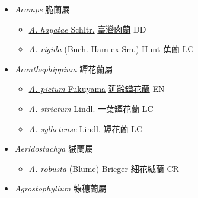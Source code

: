 
  \begin{itemize}
 \item[] \textit{Acampe} 脆蘭屬
                    
  \begin{itemize}
        \item[] \href{http://www.theplantlist.org/tpl1.1/search?q=Acampe+hayatae}{\textit{A. hayatae} Schltr.}   \href{\detokenize{http://taibnet.sinica.edu.tw/chi/taibnet_species_list.php?T2=臺灣肉蘭&T2_new_value=true&fr=y}}{臺灣肉蘭} DD
        \item[] \href{http://www.theplantlist.org/tpl1.1/search?q=Acampe+rigida}{\textit{A. rigida} (Buch.-Ham ex Sm.) Hunt}   \href{\detokenize{http://taibnet.sinica.edu.tw/chi/taibnet_species_list.php?T2=蕉蘭&T2_new_value=true&fr=y}}{蕉蘭} LC
  \end{itemize}
 \item[] \textit{Acanthephippium} 罈花蘭屬
                    
  \begin{itemize}
        \item[] \href{http://www.theplantlist.org/tpl1.1/search?q=Acanthephippium+pictum}{\textit{A. pictum} Fukuyama}   \href{\detokenize{http://taibnet.sinica.edu.tw/chi/taibnet_species_list.php?T2=延齡罈花蘭&T2_new_value=true&fr=y}}{延齡罈花蘭} EN
        \item[] \href{http://www.theplantlist.org/tpl1.1/search?q=Acanthephippium+striatum}{\textit{A. striatum} Lindl.}   \href{\detokenize{http://taibnet.sinica.edu.tw/chi/taibnet_species_list.php?T2=一葉罈花蘭&T2_new_value=true&fr=y}}{一葉罈花蘭} LC
        \item[] \href{http://www.theplantlist.org/tpl1.1/search?q=Acanthephippium+sylhetense}{\textit{A. sylhetense} Lindl.}   \href{\detokenize{http://taibnet.sinica.edu.tw/chi/taibnet_species_list.php?T2=罈花蘭&T2_new_value=true&fr=y}}{罈花蘭} LC
  \end{itemize}
 \item[] \textit{Aeridostachya} 絨蘭屬
                    
  \begin{itemize}
        \item[] \href{http://www.theplantlist.org/tpl1.1/search?q=Aeridostachya+robusta}{\textit{A. robusta} (Blume) Brieger}     \href{\detokenize{http://taibnet.sinica.edu.tw/chi/taibnet_species_list.php?T2=細花絨蘭&T2_new_value=true&fr=y}}{細花絨蘭} CR
  \end{itemize}
 \item[] \textit{Agrostophyllum} 糠穗蘭屬
                    

\end{itemize}
